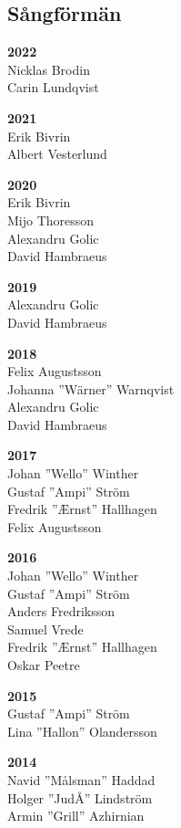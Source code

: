 \begin{flushleft}
\section{Sångförmän}
\vspace{-1em}
\end{flushleft}

{\large
\setlength{\parskip}{0.4em}
\setlength\columnsep{.5em}

\begin{multicols}{2}
\textbf{2022}\\
Nicklas Brodin\\
Carin Lundqvist

\textbf{2021}\\
Erik Bivrin\\
Albert Vesterlund

\textbf{2020}\\
Erik Bivrin\\
Mijo Thoresson\\
Alexandru Golic\\
David Hambraeus

\textbf{2019}\\
Alexandru Golic\\
David Hambraeus

\textbf{2018}\\
Felix Augustsson\\
Johanna ''Wärner'' Warnqvist\\
Alexandru Golic\\
David Hambraeus

\textbf{2017}\\
Johan ''Wello'' Winther\\
Gustaf ''Ampi'' Ström\\
Fredrik ''Ærnst'' Hallhagen\\
Felix Augustsson

\textbf{2016}\\
Johan ''Wello'' Winther\\
Gustaf ''Ampi'' Ström\\
Anders Fredriksson\\
Samuel Vrede\\
Fredrik ''Ærnst'' Hallhagen\\
Oskar Peetre

\textbf{2015}\\
Gustaf ''Ampi'' Ström\\
Lina ''Hallon'' Olandersson

\textbf{2014}\\
Navid ''Målsman'' Haddad\\
Holger ''JudÅ'' Lindström\\
Armin ''Grill'' Azhirnian


\end{multicols}}
